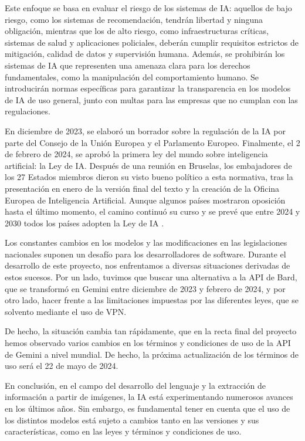 Este enfoque se basa en evaluar el riesgo de los sistemas de IA: aquellos de bajo riesgo, como los sistemas de recomendación, tendrán libertad y ninguna obligación, mientras que los de alto riesgo, como infraestructuras críticas, sistemas de salud y aplicaciones policiales, deberán cumplir requisitos estrictos de mitigación, calidad de datos y supervisión humana. Además, se prohibirán los sistemas de IA que representen una amenaza clara para los derechos fundamentales, como la manipulación del comportamiento humano. Se introducirán normas específicas para garantizar la transparencia en los modelos de IA de uso general, junto con multas para las empresas que no cumplan con las regulaciones.

En diciembre de 2023, se elaboró un borrador sobre la regulación de la IA por parte del Consejo de la Unión Europea y el Parlamento Europeo. Finalmente, el 2 de febrero de 2024, se aprobó la primera ley del mundo sobre inteligencia artificial: la Ley de IA. Después de una reunión en Bruselas, los embajadores de los 27 Estados miembros dieron su visto bueno político a esta normativa, tras la presentación en enero de la versión final del texto y la creación de la Oficina Europea de Inteligencia Artificial. Aunque algunos países mostraron oposición hasta el último momento, el camino continuó su curso y se prevé que entre 2024 y 2030 todos los países adopten la Ley de IA \cite{ElDerecho-LeyIA}.

Los constantes cambios en los modelos y las modificaciones en las legislaciones nacionales suponen un desafío para los desarrolladores de software. Durante el desarrollo de este proyecto, nos enfrentamos a diversas situaciones derivadas de estos sucesos. Por un lado, tuvimos que buscar una alternativa a la API de Bard, que se transformó en Gemini entre diciembre de 2023 y febrero de 2024, y por otro lado, hacer frente a las limitaciones impuestas por las diferentes leyes, que se solvento mediante el uso de VPN.

De hecho, la situación cambia tan rápidamente, que en la recta final del proyecto hemos observado varios cambios en los términos y condiciones de uso de la API de Gemini a nivel mundial. De hecho, la próxima actualización de los términos de uso será el 22 de mayo de 2024.

En conclusión, en el campo del desarrollo del lenguaje y la extracción de información a partir de imágenes, la IA está experimentando numerosos avances en los últimos años. Sin embargo, es fundamental tener en cuenta que el uso de los distintos modelos está sujeto a cambios tanto en las versiones y sus características, como en las leyes y términos y condiciones de uso.
